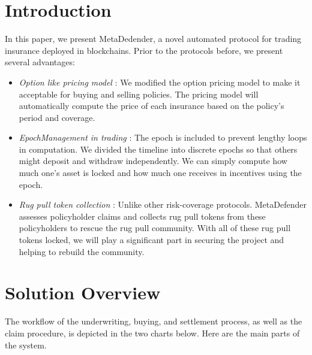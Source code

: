 \documentclass[10pt, a4paper, twocolumn]{article} %
\begin{document}
\section{Introduction}

In this paper, we present MetaDedender, a novel automated protocol for trading insurance deployed in blockchains.
Prior to the protocols before, we present several advantages:

\begin{itemize}
	\item \textit{Option like pricing model} : We modified the option pricing model to make it acceptable for buying and selling policies. The pricing model will automatically compute the price of each insurance based on the policy's period and coverage.
	\item \textit{EpochManagement in trading} : The epoch is included to prevent lengthy loops in computation.
	We divided the timeline into discrete epochs so that others might deposit and withdraw independently.
	We can simply compute how much one's asset is locked and how much one receives in incentives using the epoch.
	\item \textit{Rug pull token collection} : Unlike other risk-coverage protocols.
	MetaDefender assesses policyholder claims and collects rug pull tokens from these policyholders to rescue the rug pull community.
	With all of these rug pull tokens locked, we will play a significant part in securing the project and helping to rebuild the community.
\end{itemize}


\section{Solution Overview}\label{sec:solution-overview}

The workflow of the underwriting, buying, and settlement process, as well as the claim procedure, is depicted in the two charts below.
Here are the main parts of the system.
\end{document}
